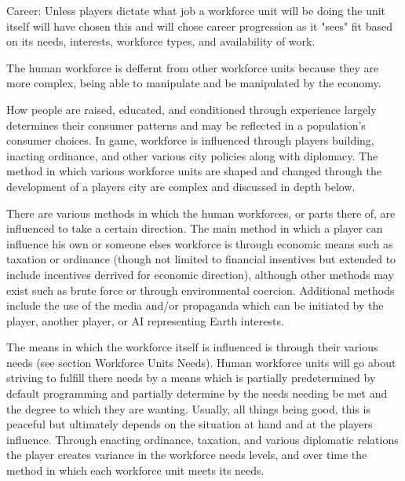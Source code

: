 Career:
Unless players dictate what job a workforce unit will be doing the unit itself will have chosen this and will chose career progression as it "sees" fit based on its needs, interests, workforce types, and availability of work.  





The human workforce is deffernt from other workforce units because they are more complex, being able to manipulate and be manipulated by the economy. 







%
%
%
%
%
How people are raised, educated, and conditioned through experience largely determines their consumer patterns and may be reflected in a population's consumer choices. In game, workforce is influenced through players building, inacting ordinance, and other various city policies along with diplomacy. The method in which various workforce units are shaped and changed through the development of a players city are complex and discussed in depth below.
%

There are various methods in which the human workforces, or parts there of, are influenced to take a certain direction. The main method in which a player can influence his own or someone elses workforce is through economic means such as taxation or ordinance (though not limited to financial insentives but extended to include incentives derrived for economic direction), although other methods may exist such as brute force or through environmental coercion. Additional methods include the use of the media and/or propaganda which can be initiated by the player, another player, or AI representing Earth interests.

The means in which the workforce itself is influenced is through their various needs (see section Workforce Units Needs). Human workforce units will go about striving to fulfill there needs by a means which is partially predetermined by default programming and partially determine by the needs needing be met and the degree to which they are wanting. Usually, all things being good, this is peaceful but ultimately depends on the situation at hand and at the players influence. Through enacting ordinance, taxation, and various diplomatic relations the player creates variance in the workforce needs levels, and over time the method in which each workforce unit meets its needs.

